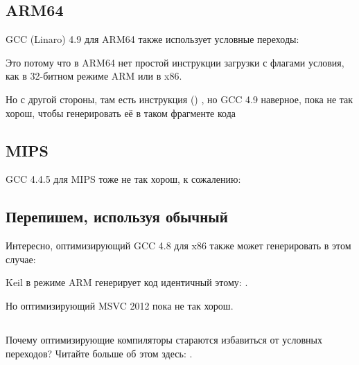 

\subsection{ARM64}

\Optimizing GCC (Linaro) 4.9 для ARM64 также использует условные переходы:



Это потому что в ARM64 нет простой инструкции загрузки с флагами условия, как  в 32-битном 
режиме ARM или  в x86.

Но с другой стороны, там есть инструкция  ()
\cite[p390, C5.5]{ARM64ref},
но GCC 4.9 наверное, пока не так
хорош, чтобы генерировать её в таком фрагменте кода

\fi

\ifdefined\IncludeMIPS
\subsection{MIPS}

GCC 4.4.5 для MIPS тоже не так хорош, к сожалению:



\fi

\subsection{Перепишем, используя обычный }



Интересно, оптимизирующий GCC 4.8 для x86 также может генерировать  в этом случае:



\ifdefined\IncludeARM
\Optimizing Keil в режиме ARM генерирует код идентичный этому: .
\fi

Но оптимизирующий MSVC 2012 пока не так хорош.

\subsection{\Conclusion{}}

Почему оптимизирующие компиляторы стараются избавиться от условных переходов? Читайте больше об этом здесь:
 .
